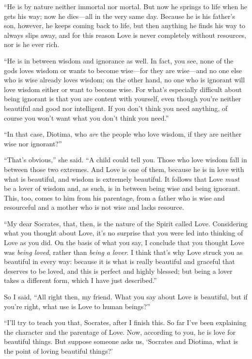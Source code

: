  “He is by nature neither immortal nor mortal. But now he springs
to life when he gets his way; now he dies---all in the very same day.
Because he is his father’s son, however, he keeps coming back to life,
but then anything he finds his way to always slips away, and for this
reason Love is never completely without resources, nor is he ever rich.

 “He is in between wisdom and ignorance as well. In fact,
you see, none of the gods loves wisdom or wants to become wise---for
they are wise---and no one else who is wise already loves wisdom; on the
other hand, no one who is ignorant will love wisdom either or want to
become wise. For what’s especially difficult about being ignorant is
that you are content with yourself, even though you’re neither beautiful
and good nor intelligent. If you don’t think you need anything, of
course you won’t want what you don’t think you need.”

“In that case, Diotima, who {\em are} the people who love wisdom, if
they are  neither wise nor ignorant?”

“That’s obvious,” she said. “A child could tell you. Those who love
wisdom fall in between those two extremes. And Love is one of them,
because he is in love with what is beautiful, and wisdom is extremely
beautiful. It follows that Love {\em must} be a lover of wisdom and, as
such, is in between being wise and being ignorant. This, too, comes to
him from his parentage, from a father who is wise and resourceful and a
mother who is not wise and lacks resource.

“My dear Socrates, that, then, is the nature of the Spirit called Love.
 Considering what you thought about Love, it’s no surprise that
you were led into thinking of Love as you did. On the basis of what you
say, I conclude that you thought Love was {\em being loved}, rather than
{\em being a lover}. I think that’s why Love struck you as beautiful in
every way: because it is what is really beautiful and graceful that
deserves to be loved, and this is perfect and highly blessed; but being
a lover takes a different form, which I have just described.”

So I said, “All right then, my friend. What you say about Love is
beautiful, but if you’re right, what use is Love to human beings?”

“I’ll try to teach you that, Socrates, after I finish this. So far I’ve
been explaining the character and the parentage of Love. Now, according
to you, he is love for beautiful things. But suppose someone asks us,
‘Socrates and Diotima, what is the point of loving beautiful things?’

